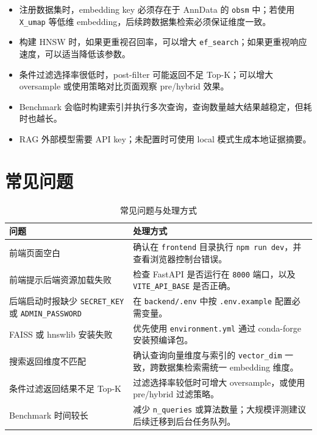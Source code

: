 \documentclass[UTF8,a4paper,12pt]{ctexrep}
\begin{document}
\begin{itemize}
  \item 注册数据集时，embedding key 必须存在于 AnnData 的 \texttt{obsm} 中；若使用 \texttt{X\_umap} 等低维 embedding，后续跨数据集检索必须保证维度一致。
  \item 构建 HNSW 时，如果更重视召回率，可以增大 \texttt{ef\_search}；如果更重视响应速度，可以适当降低该参数。
  \item 条件过滤选择率很低时，post-filter 可能返回不足 Top-K；可以增大 oversample 或使用策略对比页面观察 pre/hybrid 效果。
  \item Benchmark 会临时构建索引并执行多次查询，查询数量越大结果越稳定，但耗时也越长。
  \item RAG 外部模型需要 API key；未配置时可使用 local 模式生成本地证据摘要。
\end{itemize}

\section{常见问题}

\begin{table}[H]
  \centering
  \caption{常见问题与处理方式}
  \begin{tabularx}{0.95\textwidth}{lY}
    \toprule
    问题 & 处理方式 \\
    \midrule
    前端页面空白 & 确认在 \texttt{frontend} 目录执行 \texttt{npm run dev}，并查看浏览器控制台错误。 \\
    前端提示后端资源加载失败 & 检查 FastAPI 是否运行在 \texttt{8000} 端口，以及 \texttt{VITE\_API\_BASE} 是否正确。 \\
    后端启动时报缺少 \texttt{SECRET\_KEY} 或 \texttt{ADMIN\_PASSWORD} & 在 \texttt{backend/.env} 中按 \texttt{.env.example} 配置必需变量。 \\
    FAISS 或 hnswlib 安装失败 & 优先使用 \texttt{environment.yml} 通过 conda-forge 安装预编译包。 \\
    搜索返回维度不匹配 & 确认查询向量维度与索引的 \texttt{vector\_dim} 一致，跨数据集检索需统一 embedding 维度。 \\
    条件过滤返回结果不足 Top-K & 过滤选择率较低时可增大 oversample，或使用 pre/hybrid 过滤策略。 \\
    Benchmark 时间较长 & 减少 \texttt{n\_queries} 或算法数量；大规模评测建议后续迁移到后台任务队列。 \\
    \bottomrule
  \end{tabularx}
\end{table}
\end{document}
